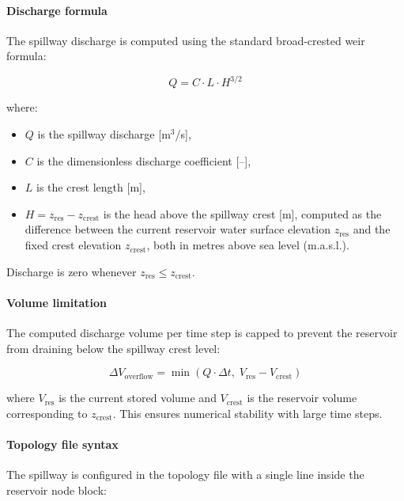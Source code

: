 \documentclass[a4paper, 12pt]{report}
\begin{document}
	\paragraph{Discharge formula}

	The spillway discharge is computed using the standard broad-crested weir formula:

	\begin{equation}
		Q = C \cdot L \cdot H^{3/2}
		\label{eq:spillway}
	\end{equation}

	\noindent where:
	\begin{itemize}
		\item $Q$ \quad is the spillway discharge [m$^3$/s],
		\item $C$ \quad is the dimensionless discharge coefficient [--],
		\item $L$ \quad is the crest length [m],
		\item $H = z_\text{res} - z_\text{crest}$ \quad is the head above the spillway crest [m], computed as the difference between the current reservoir water surface elevation $z_\text{res}$ and the fixed crest elevation $z_\text{crest}$, both in metres above sea level (m.a.s.l.).
	\end{itemize}

	Discharge is zero whenever $z_\text{res} \leq z_\text{crest}$.

	\paragraph{Volume limitation}

	The computed discharge volume per time step is capped to prevent the reservoir from draining below the spillway crest level:

	\begin{equation}
		\Delta V_\text{overflow} = \min\!\left(Q \cdot \Delta t,\; V_\text{res} - V_\text{crest}\right)
	\end{equation}

	\noindent where $V_\text{res}$ is the current stored volume and $V_\text{crest}$ is the reservoir volume corresponding to $z_\text{crest}$. This ensures numerical stability with large time steps.

	\paragraph{Topology file syntax}

	The spillway is configured in the topology file with a single line inside the reservoir node block:
\end{document}

